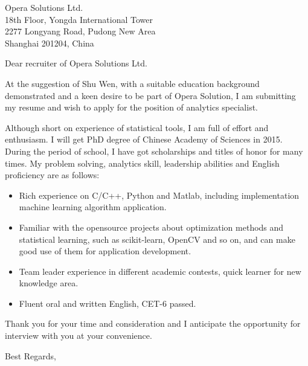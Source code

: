 \documentclass[line, margin]{letter}
\begin{document}
\signature{\textbf{Xian Yang}\\15952446119\\
yangxian10@gmail.com\\No.398 Ruoshui street\\ industrial district, Suzhou}           %
\longindentation=0pt                       %
\let\raggedleft\raggedright                %

\begin{letter}{Opera Solutions Ltd. \\ 18th Floor, Yongda International Tower\\
 2277 Longyang Road, Pudong New Area\\ Shanghai 201204, China}
\opening{Dear recruiter of Opera Solutions Ltd.}
At the suggestion of Shu Wen,
with a suitable education background demonstrated
and a keen desire to be part of Opera Solution,
I am submitting my resume and wish to apply for the position of analytics specialist.

Although short on experience of statistical tools,
I am full of effort and enthusiasm.
I will get PhD degree of Chinese Academy of Sciences in 2015.
During the period of school,
I have got scholarships and titles of honor for many times.
My problem solving, analytics skill, leadership abilities and English proficiency are as follows:
\begin{itemize}

\item Rich experience on C/C++, Python and Matlab,
including implementation machine learning algorithm application.
\item Familiar with the opensource projects about optimization methods and statistical learning,
such as scikit-learn, OpenCV and so on,
and can make good use of them for application development.

\item Team leader experience in different academic contests,
quick learner for new knowledge area.

\item Fluent oral and written English, CET-6 passed.

\end{itemize}

Thank you for your time and consideration
and I anticipate the opportunity for interview with you at your convenience.

\closing{Best Regards,}

\end{letter}
\end{document}
